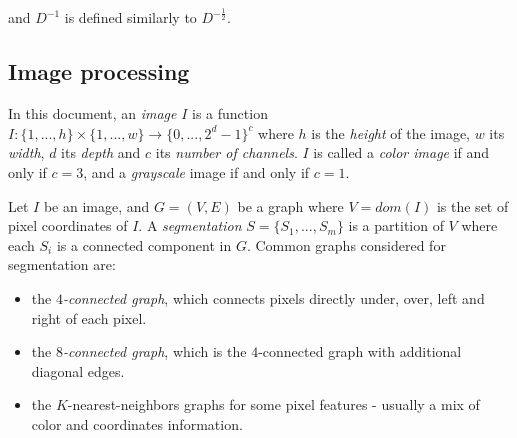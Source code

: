 and $D^{-1}$ is defined similarly to $D^{-\frac{1}{2}}$.

\subsection{Image processing}
In this document, an \emph{image} $I$ is a function $I : \{1, ..., h\} \times \{1, ..., w\} \rightarrow \{0, ..., 2^d - 1\}^c$ where $h$ is the \emph{height} of the image, $w$ its \emph{width}, $d$ its \emph{depth} and $c$ its \emph{number of channels}.  $I$ is called a \emph{color image} if and only if $c = 3$, and a \emph{grayscale} image if and only if $c = 1$.

Let $I$ be an image, and $G = (V,E)$ be a graph where $V = dom(I)$ is the set of pixel coordinates of $I$. A \emph{segmentation} $S = \{S_1, ..., S_m\}$ is a partition of $V$ where each $S_i$ is a connected component in $G$. Common graphs considered for segmentation are:

\begin{itemize}
\item the \emph{$4$-connected graph}, which connects pixels directly under, over, left and right of each pixel.
\item the \emph{$8$-connected graph}, which is the $4$-connected graph with additional diagonal edges.
\item the $K$-nearest-neighbors graphs for some pixel features - usually a mix of color and coordinates information.
\end{itemize}